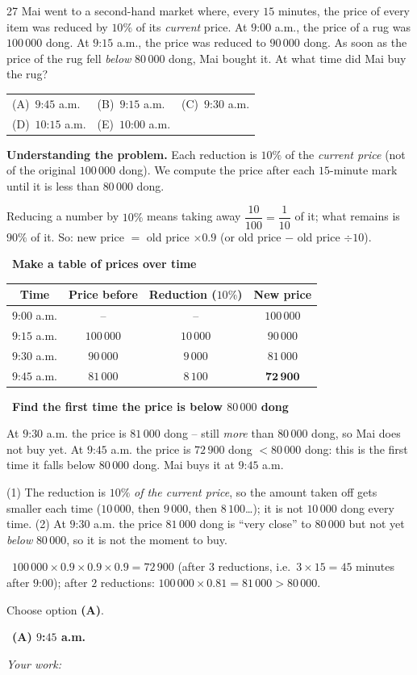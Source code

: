 \documentclass[11pt]{article}
\makeatletter
\newif\ifsol \solfalse
\providecommand{\AnsWord}{Đáp số}
\newcommand{\ans}[1]{\par\smallskip{\bfseries\color{tmGreen!88!black}\AnsWord:}\ {\bfseries\color{AnsRed}#1}\par}
\newcommand{\probsol}[1]{%
  \begin{lrbox}{\solmeasure}\begin{minipage}{\dimexpr\linewidth-24pt\relax}#1\end{minipage}\end{lrbox}%
  \ifsol
    \begin{solbox}#1\end{solbox}%
  \else
    \setlength{\solht}{\dimexpr\ht\solmeasure+\dp\solmeasure+0.85cm\relax}%
    \ifdim\solht<1.35cm\setlength{\solht}{1.35cm}\fi
    \ifdim\solht>\StudentMaxWork\setlength{\solht}{\StudentMaxWork}\fi
    \begin{tcolorbox}[colback=white,colframe=Line,boxrule=0.8pt,arc=5pt,
      left=8pt,right=8pt,top=4pt,bottom=4pt,height=\solht]{\footnotesize\color{Slate}\itshape\WorkWord}\end{tcolorbox}%
  \fi}
\newlength{\StudentMaxWork}\setlength{\StudentMaxWork}{7.5cm}
\newcommand{\step}[2]{\par\smallskip\noindent{\bfseries\color{tmBlue!85!black}\StepWord~#1.}\ {\bfseries #2}\par\nopagebreak}
\newcommand{\verify}[1]{\par\smallskip\noindent{\bfseries\color{tmGreen!80!black}\faCheckCircle\ \CheckWord}\ #1\par}
\newcommand{\choicesII}[5]{\par\smallskip\noindent
  \begin{tabularx}{\linewidth}{@{}XXX@{}}(A)\ #1&(B)\ #2&(C)\ #3\\(D)\ #4&(E)\ #5&\end{tabularx}\par}
\def\WorkWord{Your work:}
\def\AnsWord{Answer}
\def\StepWord{Step}
\def\CheckWord{Check:}
\makeatother
\begin{document}
\begin{probbox}{27}{\relax}
Mai went to a second-hand market where, every $15$ minutes, the price of every item was reduced by $10\%$ of its \emph{current} price. At $9$:$00$ a.m., the price of a rug was $100\,000$ dong. At $9$:$15$ a.m., the price was reduced to $90\,000$ dong. As soon as the price of the rug fell \emph{below} $80\,000$ dong, Mai bought it. At what time did Mai buy the rug?
\choicesII{$9$:$45$ a.m.}{$9$:$15$ a.m.}{$9$:$30$ a.m.}{$10$:$15$ a.m.}{$10$:$00$ a.m.}
\end{probbox}
\probsol{
\textbf{Understanding the problem.} Each reduction is $10\%$ of the \emph{current price} (not of the original $100\,000$ dong). We compute the price after each $15$-minute mark until it is less than $80\,000$ dong.

\begin{recallbox}Reducing a number by $10\%$ means taking away $\dfrac{10}{100}=\dfrac1{10}$ of it; what remains is $90\%$ of it. So: new price $=$ old price $\times 0.9$ (or old price $-$ old price $\div 10$).\end{recallbox}

\step{1}{Make a table of prices over time}
\begin{center}
\begin{tabular}{|c|c|c|c|}
\hline
\rowcolor{Tint}\textbf{Time} & \textbf{Price before} & \textbf{Reduction ($10\%$)} & \textbf{New price}\\
\hline
$9$:$00$ a.m. & -- & -- & $100\,000$\\
$9$:$15$ a.m. & $100\,000$ & $10\,000$ & $90\,000$\\
$9$:$30$ a.m. & $90\,000$ & $9\,000$ & $81\,000$\\
$9$:$45$ a.m. & $81\,000$ & $8\,100$ & $\mathbf{72\,900}$\\
\hline
\end{tabular}
\end{center}

\step{2}{Find the first time the price is below $80\,000$ dong}
At $9$:$30$ a.m. the price is $81\,000$ dong -- still \emph{more} than $80\,000$ dong, so Mai does not buy yet. At $9$:$45$ a.m. the price is $72\,900$ dong $<80\,000$ dong: this is the first time it falls below $80\,000$ dong. Mai buys it at $9$:$45$ a.m.

\begin{warnbox}(1) The reduction is $10\%$ \emph{of the current price}, so the amount taken off gets smaller each time ($10\,000$, then $9\,000$, then $8\,100$\dots); it is not $10\,000$ dong every time. (2) At $9$:$30$ a.m. the price $81\,000$ dong is ``very close'' to $80\,000$ but not yet \emph{below} $80\,000$, so it is not the moment to buy.\end{warnbox}

\verify{$100\,000\times 0.9\times 0.9\times 0.9=72\,900$ (after $3$ reductions, i.e.\ $3\times 15=45$ minutes after $9$:$00$); after $2$ reductions: $100\,000\times0.81=81\,000>80\,000$.}
Choose option \textbf{(A)}.
\ans{(A) $9$:$45$ a.m.}
}
\end{document}
